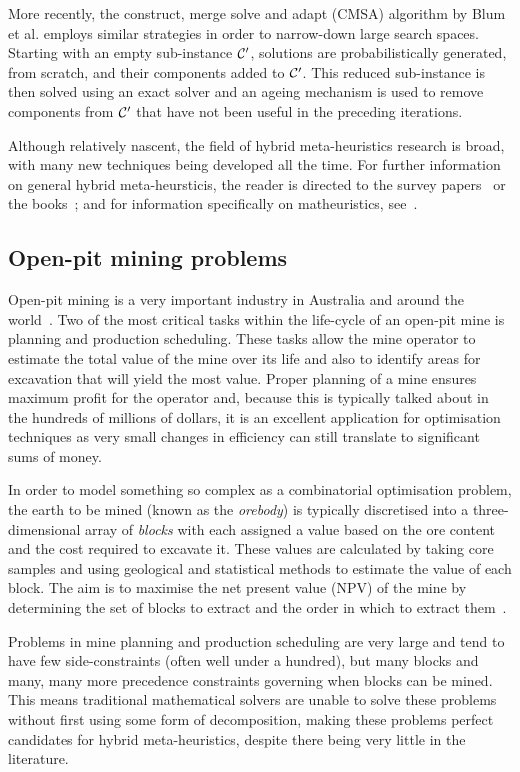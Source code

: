 \documentclass[journal]{IEEEtran}
\begin{document}
More recently, the construct, merge solve and adapt (CMSA) algorithm by Blum et al. \cite{cmsa} employs similar strategies in order to narrow-down large search spaces. Starting with an empty sub-instance $\S{C}^\prime$, solutions are probabilistically generated, from scratch, and their components added to $\S{C}^\prime$. This reduced sub-instance is then solved using an exact solver and an ageing mechanism is used to remove components from $\S{C}^\prime$ that have not been useful in the preceding iterations.

Although relatively nascent, the field of hybrid meta-heuristics research is broad, with many new techniques being developed all the time. For further information on general hybrid meta-heursticis, the reader is directed to the survey papers~\cite{talbi,hybridmeta,hybrid-decomp} or the books~\cite{hybrid-book1,hybrid-book2}; and for information specifically on matheuristics, see~\cite{matheuristics,matheuristics-new1,matheuristics-new2}.

\subsection{Open-pit mining problems}
Open-pit mining is a very important industry in Australia and around the world~\cite{singh}. Two of the most critical tasks within the life-cycle of an open-pit mine is planning and production scheduling. These tasks allow the mine operator to estimate the total value of the mine over its life and also to identify areas for excavation that will yield the most value. Proper planning of a mine ensures maximum profit for the operator and, because this is typically talked about in the hundreds of millions of dollars, it is an excellent application for optimisation techniques as very small changes in efficiency can still translate to significant sums of money.

In order to model something so complex as a combinatorial optimisation problem, the earth to be mined (known as the \emph{orebody}) is typically discretised into a three-dimensional array of \emph{blocks} with each assigned a value based on the ore content and the cost required to excavate it. These values are calculated by taking core samples and using geological and statistical methods to estimate the value of each block. The aim is to maximise the net present value (NPV) of the mine by determining the set of blocks to extract and the order in which to extract them~\cite{meagher}.

Problems in mine planning and production scheduling are very large and tend to have few side-constraints (often well under a hundred), but many blocks and many, many more precedence constraints governing when blocks can be mined. This means traditional mathematical solvers are unable to solve these problems without first using some form of decomposition, making these problems perfect candidates for hybrid meta-heuristics, despite there being very little in the literature.
\end{document}
